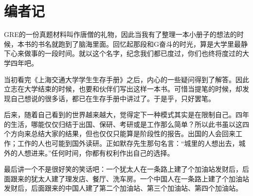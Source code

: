 \chapter*{编者记}
\pagestyle{plain}

GRE的一份真题材料叫作唐僧的礼物，因此当我有了整理一本小册子的想法的时候，本书的书名就跑到了脑海里面。回忆起那段和G奋斗的时光，算是大学里最静下心来做事的一段时间。就以这个名字，纪念我们都已度过，你们也终将度过的大学四年吧。\par
当初看完《上海交通大学学生生存手册》之后，内心的一些疑问得到了解答。因此立志在大学结束的时候，也要和伙伴们写出这样一本书。可惜当提笔的时候，却发现自己想说的很多话，都已在生存手册中讲过了。于是乎，只好罢笔。\par
后来，随着自己看到的世界越来越大，觉得定下一种模式其实是在限制自己。四年的生活，哪能仅仅归结于出国、保研、考研或是工作那么简单？所以此书虽以这四个方向来总结大家的结果，但也仅仅只能算是阶段性的报告。出国的人会回来工作；工作的人也可能到国外读研。正如默存先生那句名言：“城里的人想出去，城外的人想进来。”任何时间，你都有权利作出自己的选择。\par
最后讲一个不是很好笑的笑话吧：一个犹太人在一条路上建了个加油站发财后，后面跟来的犹太人建了理发店、餐厅、洗车房。一个中国人在一条路上建了个加油站发财后，后面跟来的中国人建了第二个加油站、第三个加油站、第四个加油站。